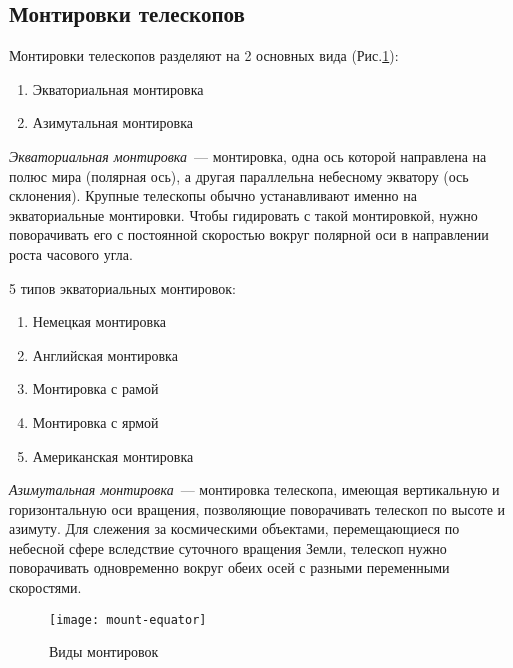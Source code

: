 \subsection{Монтировки телескопов}

Монтировки телескопов разделяют на 2 основных вида (Рис.\ref{mount-equator}):
\begin{enumerate}
\item Экваториальная монтировка
\item Азимутальная монтировка
\end{enumerate}

\textit{Экваториальная монтировка}~--- монтировка, одна ось которой направлена на полюс мира (полярная ось), а другая параллельна небесному экватору (ось склонения). Крупные телескопы обычно устанавливают именно на экваториальные монтировки. Чтобы гидировать с такой монтировкой, нужно поворачивать его с постоянной скоростью вокруг полярной оси в направлении роста часового угла.

5 типов экваториальных монтировок:
\begin{enumerate}
\item Немецкая монтировка
\item Английская монтировка
\item Монтировка с рамой
\item Монтировка с ярмой
\item Американская монтировка
\end{enumerate}

\textit{Азимутальная монтировка}~--- монтировка телескопа, имеющая вертикальную и горизонтальную оси вращения, позволяющие поворачивать телескоп по высоте и азимуту. Для слежения за космическими объектами, перемещающиеся по небесной сфере вследствие суточного вращения Земли, телескоп нужно поворачивать одновременно вокруг обеих осей с разными переменными скоростями.

\begin{figure}[!h]
\centering
\texttt{[image: mount-equator]}
\caption{Виды монтировок}\label{mount-equator}
\end{figure}